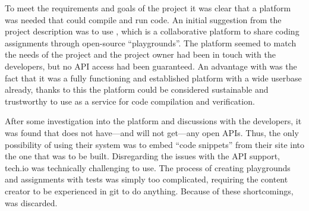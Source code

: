 To meet the requirements and goals of the project it was clear that a platform was needed that could compile and run code. An initial suggestion from the project description was to use \techio{}, which is a collaborative platform to share coding assignments through open-source ``playgrounds''. The platform seemed to match the needs of the project and the project owner had been in touch with the developers, but no API access had been guaranteed. An advantage with \techio{} was the fact that it was a fully functioning and established platform with a wide userbase already, thanks to this the platform could be considered sustainable and trustworthy to use as a service for code compilation and verification.

After some investigation into the platform and discussions with the developers, it was found that \techio{} does not have---and will not get---any open APIs. Thus, the only possibility of using their system was to  embed ``code snippets'' from their site into the one that was to be built. Disregarding the issues with the API support, tech.io was technically challenging to use. The process of creating playgrounds and assignments with tests was simply too complicated, requiring the content creator to be experienced in git to do anything. Because of these shortcomings, \techio{} was discarded.\\

